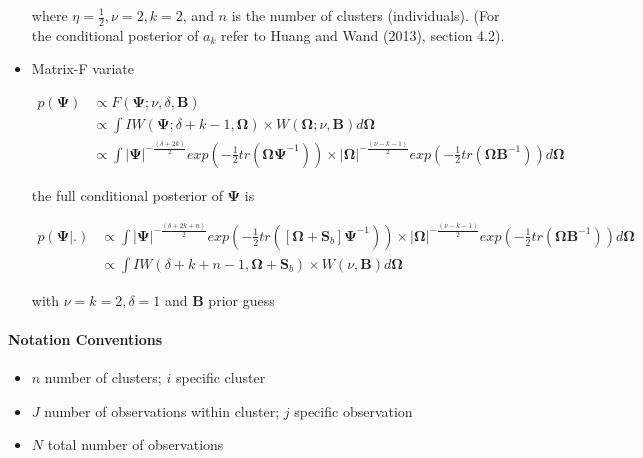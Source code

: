 \documentclass[a4paper]{article}
\begin{document}
\begin{itemize}
where $\eta = \frac{1}{2}, \nu = 2, k = 2$, and $n$ is the number of clusters (individuals). (For the conditional posterior of $a_k$ refer to Huang and Wand (2013), section 4.2).
	
	\item Matrix-F variate
	
\begin{equation*}
 \begin{split} 
  p(\bm{\Psi})& \propto F(\bm{\Psi}; \nu, \delta, \bm{B}) \\
  & \propto \int IW(\bm{\Psi}; \delta + k - 1, \bm{\Omega}) \times W(\bm{\Omega}; \nu, \bm{B})d\bm{\Omega} \\
  & \propto \int |\bm{\Psi}|^{-\frac{(\delta+2k)}{2}}exp\left(-\frac{1}{2}tr(\bm{\Omega}\bm{\Psi}^{-1})\right) \times |\bm{\Omega}|^{-\frac{(\nu-k-1)}{2}}exp\left(-\frac{1}{2}tr(\bm{\Omega}\bm{B}^{-1})\right)d\bm{\Omega}
 \end{split}
\end{equation*}	

the full conditional posterior of $\bm{\Psi}$ is

\begin{equation}
 \begin{split} 
  p(\bm{\Psi}|.)& \propto \int |\bm{\Psi}|^{-\frac{(\delta+2k+n)}{2}}exp\left(-\frac{1}{2}tr([\bm{\Omega}+\bm{S}_b]\bm{\Psi}^{-1})\right) \times |\bm{\Omega}|^{-\frac{(\nu-k-1)}{2}}exp\left(-\frac{1}{2}tr(\bm{\Omega}\bm{B}^{-1})\right)d\bm{\Omega} \\
  & \propto \int IW(\delta+k+n-1, \bm{\Omega} + \bm{S}_{b}) \times W(\nu, \bm{B})d\bm{\Omega}
 \end{split}
\end{equation}			

with $\nu = k = 2, \delta = 1$ and $\bm{B}$ prior guess
	
\end{itemize}

\paragraph{Notation Conventions}

\begin{itemize}
	\item $n$ number of clusters; $i$ specific cluster
	\item $J$ number of observations within cluster; $j$ specific observation
	\item $N$ total number of observations
\end{itemize}
\end{document}
